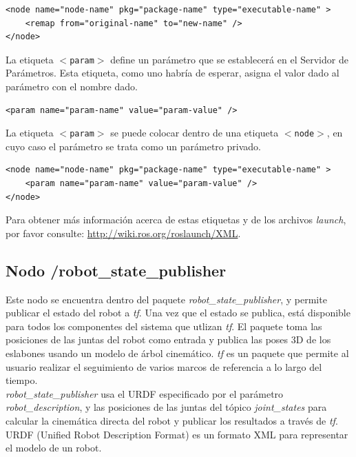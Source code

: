 \documentclass[user_manual.tex]{subfiles}
\begin{document}
\begin{verbatim}
<node name="node-name" pkg="package-name" type="executable-name" >
	<remap from="original-name" to="new-name" />
</node>
\end{verbatim}

La etiqueta \texttt{$ < $param$ > $} define un parámetro que se establecerá en el Servidor de Parámetros. Esta etiqueta, como uno habría de esperar, asigna el valor dado al parámetro con el nombre dado.

\begin{verbatim}
<param name="param-name" value="param-value" />
\end{verbatim}

La etiqueta \texttt{$ < $param$ > $} se puede colocar dentro de una etiqueta \texttt{$ < $node$ > $}, en cuyo caso el parámetro se trata como un parámetro privado.

\begin{verbatim}
<node name="node-name" pkg="package-name" type="executable-name" >
	<param name="param-name" value="param-value" />
</node>
\end{verbatim}

Para obtener más información acerca de estas etiquetas y de los archivos \textit{launch}, por favor consulte: \url{http://wiki.ros.org/roslaunch/XML}. 

\subsection{Nodo /robot\_state\_publisher}
Este nodo se encuentra dentro del paquete \textit{robot\_state\_publisher}, y permite publicar el estado del robot a \textit{tf}. Una vez que el estado se publica, está disponible para todos los componentes del sistema que utlizan \textit{tf}. El paquete toma las posiciones de las juntas del robot como entrada y publica las poses 3D de los eslabones usando un modelo de árbol cinemático. \textit{tf} es un paquete que permite al usuario realizar el seguimiento de varios marcos de referencia a lo largo del tiempo.\\

\textit{robot\_state\_publisher} usa el URDF especificado por el parámetro \textit{robot\_description}, y las posiciones de las juntas del tópico \textit{joint\_states} para calcular la cinemática directa del robot y publicar los resultados a través de \textit{tf}. URDF (Unified Robot Description Format) es un formato  XML para representar el modelo de un robot.
\end{document}
